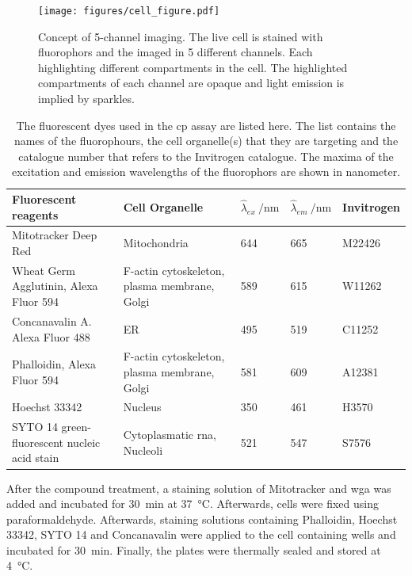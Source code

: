 \begin{figure}[H]
	\centering
	\texttt{[image: figures/cell\_figure.pdf]}
	\caption[Concept of 5-Channel Imaging]{Concept of 5-channel imaging. The live cell is stained with fluorophors and the imaged in 5 different channels. Each highlighting different compartments in the cell. The highlighted compartments of each channel are opaque and light emission is implied by sparkles.}
	\label{fig:cellfigure}
\end{figure}
\begin{table}[H]
	\begin{center}
		\caption[List of Fluorescents Dyes]{The fluorescent dyes used in the \ac{cp} assay are listed here. The list contains the names of the fluorophours, the cell organelle(s) that they are targeting and the catalogue number that refers to the Invitrogen catalogue.\cite{Wawer2014} The maxima of the excitation and emission wavelengths of the fluorophors are shown in nanometer.}
		\label{tab:dyes}
		\begin{tabularx}{\textwidth}{XXlll}
			\toprule
			Fluorescent reagents & Cell Organelle &  $\hat{\lambda}_{ex}\SI{}{\per\nano\meter}$ & $\hat{\lambda}_{em}\SI{}{\per\nano\meter}$ & Invitrogen\\
			
			\midrule
			
			Mitotracker Deep Red & Mitochondria &644 & 665& M22426\\
			
			Wheat Germ Agglutinin, Alexa Fluor 594& F-actin cytoskeleton, plasma membrane, Golgi & 589 & 615 & W11262\\
			
			Concanavalin A.  Alexa Fluor 488 & ER & 495 & 519 &  C11252\\
			
			Phalloidin, Alexa Fluor 594 & F-actin cytoskeleton, plasma membrane, Golgi& 581 & 609 & A12381\\
			
			Hoechst 33342 & Nucleus & 350 & 461 & H3570\\
			
			SYTO 14 green-fluorescent nucleic acid stain & Cytoplasmatic \ac{rna}, Nucleoli & 521 & 547 & S7576\\
			\bottomrule
		\end{tabularx}
	\end{center}
\end{table}\noindent
After the compound treatment, a staining solution of Mitotracker and \ac{wga} was added and incubated for \SI{30}{\minute} at \SI{37}{\degreeCelsius}. Afterwards, cells were fixed using paraformaldehyde. Afterwards, staining solutions containing Phalloidin, Hoechst 33342, SYTO 14 and Concanavalin were applied to the cell containing wells and incubated for \SI{30}{\minute}. Finally, the plates were thermally sealed and stored at \SI{4}{\degreeCelsius}.\cite{Bray2016,Wawer2014}\\
